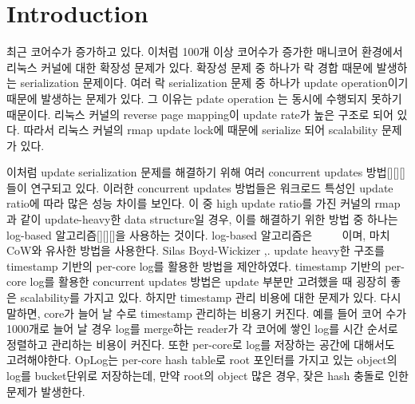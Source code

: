 \section{Introduction} \label{sec:introduction}

% 
\ifkor
최근 코어수가 증가하고 있다.
이처럼 100개 이상 코어수가 증가한 매니코어 환경에서 리눅스 커널에 대한 확장성 문제가 있다. 
확장성 문제 중 하나가 락 경합 때문에 발생하는 serialization 문제이다.
여러 락 serialization 문제 중 하나가 update operation이기 때문에 발생하는 문제가 있다. 그 이유는
pdate operation 는 동시에 수행되지 못하기 때문이다.
리눅스 커널의 reverse page mapping이 update rate가 높은 구조로 되어 있다.
따라서 리눅스 커널의 rmap update lock에 때문에 serialize 되어 scalability 문제가 있다.
\else

\fi


%
\ifkor

이처럼 update serialization 문제를 해결하기 위해 여러 concurrent updates 방법[][][] 들이 연구되고 있다. 
이러한 concurrent updates 방법들은 워크로드 특성인 update ratio에 따라 많은 성능 차이를 보인다.
이 중 high update ratio를 가진 커널의 rmap과 같이 update-heavy한 data structure일 경우, 이를 해결하기
위한 방법 중 하나는 log-based 알고리즘[][][]을 사용하는 것이다. 
log-based 알고리즘은 ~~~~ 이며, 마치 CoW와 유사한 방법을 사용한다. 
Silas Boyd-Wickizer ,. update heavy한 구조를 timestamp 기반의 per-core log를 활용한 방법을
제안하였다.
timestamp 기반의 per-core log를 활용한 concurrent updates 방법은 update 부분만 고려했을 때 굉장히 좋은
scalability를 가지고 있다. 하지만 timestamp 관리 비용에 대한 문제가 있다.
다시 말하면, core가 늘어 날 수로 timestamp 관리하는 비용기 커진다. 
예를 들어 코어 수가 1000개로 늘어 날 경우 log를 merge하는 reader가 각 코어에 쌓인 log를 시간 순서로 정렬하고 관리하는
 비용이 커진다.
또한 per-core로 log를 저장하는 공간에 대해서도 고려해야한다. OpLog는 per-core hash table로 root 포인터를
가지고 있는 object의 log를 bucket단위로 저장하는데, 만약 root의 object 많은 경우, 잦은 hash
충돌로 인한 문제가 발생한다.

